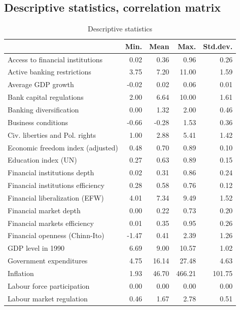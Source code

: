 \begin{refsection}
\begin{subappendices}
    \section{Descriptive statistics, correlation matrix}
    \begin{table}[!ht]
    \caption{Descriptive statistics}\label{ch3tab:desc_stat}
    \centering
    \begin{tabular}{lrrrr}
      \toprule
         & Min. & Mean & Max. & Std.dev. \\ 
      \midrule
      Access to financial institutions & 0.02 & 0.36 & 0.96 & 0.26 \\ 
      Active banking restrictions & 3.75 & 7.20 & 11.00 & 1.59 \\ 
      Average GDP growth & -0.02 & 0.02 & 0.06 & 0.01 \\ 
      Bank capital regulations & 2.00 & 6.64 & 10.00 & 1.61 \\ 
      Banking diversification & 0.00 & 1.32 & 2.00 & 0.46 \\ 
      Business conditions & -0.66 & -0.28 & 1.53 & 0.36 \\ 
      Civ. liberties and Pol. rights & 1.00 & 2.88 & 5.41 & 1.42 \\ 
      Economic freedom index (adjusted) & 0.48 & 0.70 & 0.89 & 0.10 \\ 
      Education index (UN) & 0.27 & 0.63 & 0.89 & 0.15 \\ 
      Financial institutions depth & 0.02 & 0.31 & 0.86 & 0.24 \\ 
      Financial institutions efficiency & 0.28 & 0.58 & 0.76 & 0.12 \\ 
      Financial liberalization (EFW) & 4.01 & 7.34 & 9.49 & 1.52 \\ 
      Financial market depth & 0.00 & 0.22 & 0.73 & 0.20 \\ 
      Financial markets efficiency & 0.01 & 0.35 & 0.95 & 0.26 \\ 
      Financial openness (Chinn-Ito) & -1.47 & 0.41 & 2.39 & 1.26 \\ 
      GDP level in 1990 & 6.69 & 9.00 & 10.57 & 1.02 \\ 
      Government expenditures & 4.75 & 16.14 & 27.48 & 4.63 \\ 
      Inflation & 1.93 & 46.70 & 466.21 & 101.75 \\ 
      Labour force participation & 0.00 & 0.00 & 0.00 & 0.00 \\ 
      Labour market regulation & 0.46 & 1.67 & 2.78 & 0.51 \\ 

\end{tabular}
\end{table}
\end{subappendices}
\end{refsection}
